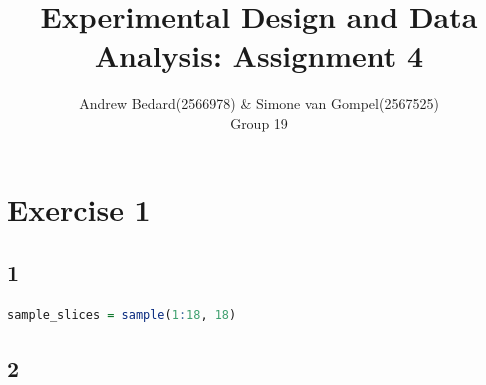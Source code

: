 \documentclass{article}
\title{Experimental Design and Data Analysis: Assignment 4}
\author{Andrew Bedard(2566978) \& Simone van Gompel(2567525) \\ Group 19}
\begin{document}
  \maketitle

  \section*{Exercise 1}
    \subsection*{1}
      \begin{lstlisting}[language=R]
      sample_slices = sample(1:18, 18)
      \end{lstlisting}
    
    \subsection*{2}
\end{document}
